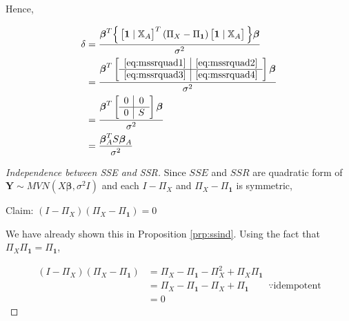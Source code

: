 \documentclass[]{book}
\theoremstyle{definition}
\theoremstyle{definition}
\theoremstyle{definition}
\theoremstyle{remark}
\let\BeginKnitrBlock\begin \let\EndKnitrBlock\end
\begin{document}
Hence,

\begin{equation}
  \begin{split}
    \delta & = \frac{\boldsymbol\beta^T \Big\{ \begin{bmatrix} \mathbf{1} \mid \mathbb{X}_A \end{bmatrix}^T(\Pi_X - \Pi_{\mathbf{1}})\begin{bmatrix} \mathbf{1} \mid \mathbb{X}_A \end{bmatrix} \Big\} \boldsymbol\beta }{\sigma^2} \\
    & = \frac{\boldsymbol\beta^T \left[\begin{array}{c|c}
      \eqref{eq:mssrquad1} & \eqref{eq:mssrquad2} \\ \hline
      \eqref{eq:mssrquad3} & \eqref{eq:mssrquad4}
    \end{array}\right] \boldsymbol\beta}{\sigma^2} \\
    & = \frac{\boldsymbol\beta^T \left[\begin{array}{c|c}
      0 & 0 \\ \hline
      0 & S
    \end{array}\right] \boldsymbol\beta}{\sigma^2} \\
    & = \frac{\boldsymbol\beta_A^T S \boldsymbol\beta_A}{\sigma^2}
  \end{split}
  \label{eq:mssrdelta}
\end{equation}

\BeginKnitrBlock{proof}[Independence between SSE and SSR]
{}Since \(SSE\) and \(SSR\) are quadratic form of \(\mathbf{Y} \sim MVN(X\boldsymbol\beta, \sigma^2 I)\) and each \(I - \Pi_X\) and \(\Pi_X - \Pi_{\mathbf{1}}\) is symmetric,

Claim: \((I - \Pi_X)(\Pi_X - \Pi_{\mathbf{1}}) = 0\)

We have already shown this in Proposition \ref{prp:ssind}. Using the fact that \(\Pi_X\Pi_{\mathbf{1}} = \Pi_{\mathbf{1}}\),

\begin{equation*}
  \begin{split}
    (I - \Pi_X)(\Pi_X - \Pi_{\mathbf{1}}) & = \Pi_X - \Pi_{\mathbf{1}} - \Pi_X^2 + \Pi_X\Pi_{\mathbf{1}} \\
    & = \Pi_X - \Pi_{\mathbf{1}} - \Pi_X + \Pi_{\mathbf{1}} \qquad \because \text{idempotent} \\
    & = 0
  \end{split}
\end{equation*}
\EndKnitrBlock{proof}
\end{document}

